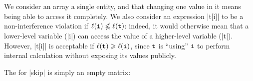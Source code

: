 We consider an array a single entity, and that changing one value in it means being able to access it completely.
We also consider an expression \prc|t[i]| to be a non-interference violation if \(\ell(\mathtt{i}) \nleqslant \ell(\mathtt{t})\): indeed, it would otherwise mean that a lower-level variable (\prc|i|) can access the value of a higher-level variable (\prc|t|).
However, \prc|t[i]| is acceptable if \(\ell(\mathtt{t}) \geqslant \ell(\mathtt{i})\), since $\mathtt{t}$ is \enquote{using} \(\mathtt{i}\) to perform internal calculation without exposing its values publicly.

The \SFM for \prc|skip| is simply an empty matrix: %

